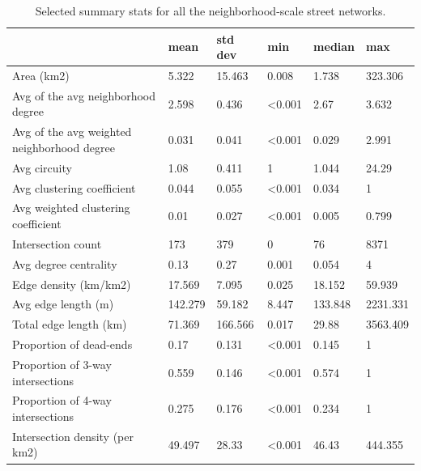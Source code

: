 \documentclass{article}
\begin{document}
\begin{table}
\centering
\caption{Selected summary stats for all the neighborhood-scale street networks.}
\label{table05}
\begin{tabular}{llllll}
	\toprule
	& mean    & std dev       & min            & median         & max      \\
	\midrule
	Area (km2)                                  & 5.322   & 15.463  & 0.008          & 1.738          & 323.306  \\
	Avg of the avg neighborhood degree          & 2.598   & 0.436   & \textless0.001 & 2.67           & 3.632    \\
	Avg of the avg weighted neighborhood degree & 0.031   & 0.041   & \textless0.001 & 0.029          & 2.991    \\
	Avg circuity                                & 1.08    & 0.411   & 1              & 1.044          & 24.29    \\
	Avg clustering coefficient                  & 0.044   & 0.055   & \textless0.001 & 0.034          & 1        \\
	Avg weighted clustering coefficient         & 0.01    & 0.027   & \textless0.001 & 0.005          & 0.799    \\
	Intersection count                          & 173     & 379     & 0              & 76             & 8371     \\
	Avg degree centrality                       & 0.13    & 0.27    & 0.001          & 0.054          & 4        \\
	Edge density (km/km2)                       & 17.569  & 7.095   & 0.025          & 18.152         & 59.939   \\
	Avg edge length (m)                         & 142.279 & 59.182  & 8.447          & 133.848        & 2231.331 \\
	Total edge length (km)                      & 71.369  & 166.566 & 0.017          & 29.88          & 3563.409 \\
	Proportion of dead-ends                     & 0.17    & 0.131   & \textless0.001 & 0.145          & 1        \\
	Proportion of 3-way intersections           & 0.559   & 0.146   & \textless0.001 & 0.574          & 1        \\
	Proportion of 4-way intersections           & 0.275   & 0.176   & \textless0.001 & 0.234          & 1        \\
	Intersection density (per km2)              & 49.497  & 28.33   & \textless0.001 & 46.43          & 444.355  \\

\end{tabular}
\end{table}
\end{document}
